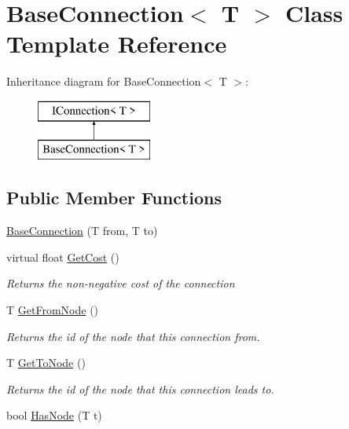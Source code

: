 \hypertarget{class_base_connection}{}\section{Base\+Connection$<$ T $>$ Class Template Reference}
\label{class_base_connection}
Inheritance diagram for Base\+Connection$<$ T $>$\+:\begin{figure}[H]
\begin{center}
\leavevmode
\includegraphics[height=2.000000cm]{class_base_connection}
\end{center}
\end{figure}
\subsection*{Public Member Functions}
\begin{DoxyCompactItemize}
\item 
\mbox{\hyperlink{class_base_connection_a37e4aa9ebfd71b7b5916a2d82bd58a14}{Base\+Connection}} (T from, T to)
\item 
virtual float \mbox{\hyperlink{class_base_connection_a3f2351e9bf997450cca8f64e1e32337a}{Get\+Cost}} ()
\begin{DoxyCompactList}\small\item\em Returns the non-\/negative cost of the connection \end{DoxyCompactList}\item 
T \mbox{\hyperlink{class_base_connection_a45f52b2a297e6ac3a1bca5b5b0d80b89}{Get\+From\+Node}} ()
\begin{DoxyCompactList}\small\item\em Returns the id of the node that this connection from. \end{DoxyCompactList}\item 
T \mbox{\hyperlink{class_base_connection_ad6baf1f89a5abd5f860e1ec58244aab7}{Get\+To\+Node}} ()
\begin{DoxyCompactList}\small\item\em Returns the id of the node that this connection leads to. \end{DoxyCompactList}\item 
bool \mbox{\hyperlink{class_base_connection_a94d80620b77e0c9c0afdcef31ade9196}{Has\+Node}} (T t)
\end{DoxyCompactItemize}
